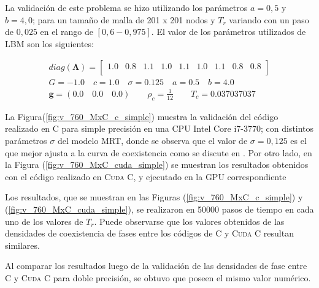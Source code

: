 La validación de este problema se hizo utilizando los parámetros $a =0,5$ y $b = 4,0$; para un tamaño de malla de 201 x 201 nodos y $T_r$ variando con un paso de $0,025$ en el rango de $[0,6 - 0,975]$.  El valor de los parámetros utilizados de LBM son los siguientes:

\begin{align*}
diag(\mathbf{\Lambda}) = 
\begin{bmatrix}
1.0 & 0.8 & 1.1 & 1.0 & 1.1 & 1.0 & 1.1 & 0.8 & 0.8 \\
\end{bmatrix}\\
G = -1.0 \quad c = 1.0 \quad \sigma = 0.125 \quad a = 0.5 \quad b = 4.0 \\
\mathbf{g} = (0.0 \quad 0.0 \quad 0.0 ) \qquad \rho_c = \frac{1}{12} \qquad T_c = 0.037037037
\end{align*}

La Figura(\ref{fig:v_760_MxC_c_simple}) muestra la validación del código realizado en \textsc{C} para simple precisión en una CPU Intel Core i7-3770; con distintos parámetros $\sigma$ del modelo MRT, donde se observa que el valor de $\sigma = 0,125$ es el que mejor ajusta a la curva de coexistencia como se discute en \cite{fogliatto2018modelado}. Por otro lado, en la Figura (\ref{fig:v_760_MxC_cuda_simple}) se muestran los resultados obtenidos con el código realizado en \textsc{Cuda C}, y ejecutado en la GPU correspondiente

Los resultados, que se muestran en las Figuras (\ref{fig:v_760_MxC_c_simple}) y (\ref{fig:v_760_MxC_cuda_simple}), se realizaron en 50000 pasos de tiempo en cada uno de los valores de $T_r$. Puede observarse que los valores obtenidos de las densidades de coexistencia de fases entre los códigos de \textsc{C} y \textsc{Cuda C} resultan similares.

Al comparar los resultados luego de la validación de las densidades de fase entre \textsc{C} y \textsc{Cuda C} para doble precisión, se obtuvo que poseen el mismo valor numérico. 

